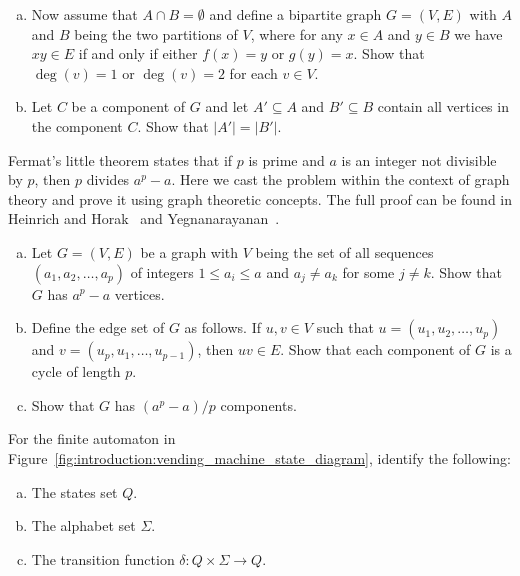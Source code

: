 \begin{problem}
\begin{enumerate}[(a)]
  \item Now assume that $A \cap B = \emptyset$ and define a bipartite
    graph $G = (V, E)$ with $A$ and $B$ being the two partitions of
    $V$, where for any $x \in A$ and $y \in B$ we have $xy \in E$ if
    and only if either $f(x) = y$ or $g(y) = x$. Show that
    $\deg(v) = 1$ or $\deg(v) = 2$ for each $v \in V$.

  \item Let $C$ be a component of $G$ and let $A' \subseteq A$ and
    $B' \subseteq B$ contain all vertices in the component $C$. Show
    that $|A'| = |B'|$.
  \end{enumerate}

\item Fermat's little theorem states
  that if $p$ is prime and $a$ is an integer not divisible by $p$,
  then $p$ divides $a^p - a$. Here we cast the problem within the
  context of graph theory and prove it using graph theoretic
  concepts. The full proof can be found in
  Heinrich and
  Horak~\cite{HeinrichHorak1994} and
  Yegnanarayanan~\cite{Yegnanarayanan2005}.
  \begin{enumerate}[(a)]
  \item Let $G = (V,E)$ be a graph with $V$ being the set of all
    sequences $(a_1, a_2, \dots, a_p)$ of integers
    $1 \leq a_i \leq a$ and $a_j \neq a_k$ for some $j \neq k$. Show
    that $G$ has $a^p - a$ vertices.

  \item Define the edge set of $G$ as follows. If $u,v \in V$ such
    that $u = (u_1, u_2, \dots, u_p)$ and
    $v = (u_p, u_1, \dots, u_{p-1})$, then $uv \in E$. Show that each
    component of $G$ is a cycle of length $p$.

  \item Show that $G$ has $(a^p - a) / p$ components.
  \end{enumerate}

\item For the finite automaton in
  Figure~\ref{fig:introduction:vending_machine_state_diagram},
  identify the following:
  \begin{enumerate}[(a)]
  \item The states set $Q$.

  \item The alphabet set $\Sigma$.

  \item The transition function $\delta: Q \times \Sigma \to Q$.


\end{enumerate}
\end{problem}
